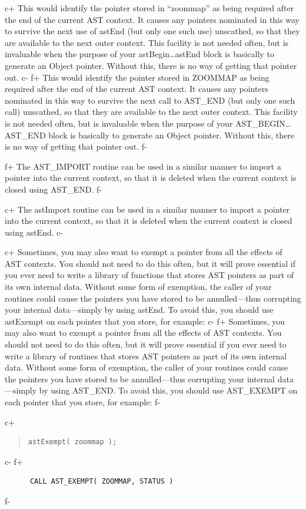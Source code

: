 \documentclass[twoside,11pt]{article}
\begin{document}
c+
This would identify the pointer stored in ``zoommap'' as being required
after the end of the current AST context. It causes any pointers
nominated in this way to survive the next use of astEnd (but only one
such use) unscathed, so that they are available to the next outer
context.  This facility is not needed often, but is invaluable when
the purpose of your astBegin\ldots astEnd block is basically to
generate an Object pointer. Without this, there is no way of getting
that pointer out.
c-
f+
This would identify the pointer stored in ZOOMMAP as being required after
the end of the current AST context. It causes any pointers nominated
in this way to survive the next call to AST\_END (but only one such
call) unscathed, so that they are available to the next outer context.
This facility is not needed often, but is invaluable when the purpose
of your AST\_BEGIN\ldots AST\_END block is basically to generate an
Object pointer. Without this, there is no way of getting that pointer
out.
f-

f+
The AST\_IMPORT routine can be used in a similar manner to import a
pointer into the current context, so that it is deleted when the current
context is closed using AST\_END.
f-

c+
The astImport routine can be used in a similar manner to import a
pointer into the current context, so that it is deleted when the current
context is closed using astEnd.
c-

c+
Sometimes, you may also want to exempt a pointer from all the effects
of AST contexts. You should not need to do this often, but it will
prove essential if you ever need to write a library of functions that
stores AST pointers as part of its own internal data. Without some
form of exemption, the caller of your routines could cause the
pointers you have stored to be annulled---thus corrupting your
internal data---simply by using astEnd. To avoid this, you should use
astExempt on each pointer that you store, for example:
c-
f+
Sometimes, you may also want to exempt a pointer from all the effects
of AST contexts. You should not need to do this often, but it will
prove essential if you ever need to write a library of routines that
stores AST pointers as part of its own internal data. Without some
form of exemption, the caller of your routines could cause the
pointers you have stored to be annulled---thus corrupting your
internal data---simply by using AST\_END. To avoid this, you should
use AST\_EXEMPT on each pointer that you store, for example:
f-

c+
\begin{quote}
\small
\begin{verbatim}
astExempt( zoommap );
\end{verbatim}
\normalsize
\end{quote}
c-
f+
\small
\begin{verbatim}
      CALL AST_EXEMPT( ZOOMMAP, STATUS )
\end{verbatim}
\normalsize
f-
\end{document}
